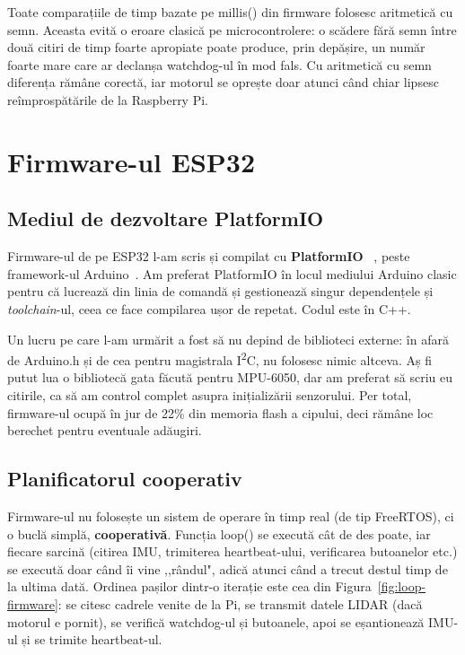 \documentclass[a4paper,12pt,twoside,openany]{report}
\renewcommand{\texttt}[1]{\textnormal{#1}}
\begin{document}
Toate comparațiile de timp bazate pe \texttt{millis()} din firmware folosesc
aritmetică cu semn. Aceasta evită o eroare clasică pe microcontrolere: o
scădere fără semn între două citiri de timp foarte apropiate poate produce,
prin depășire, un număr foarte mare care ar declanșa watchdog-ul în mod fals.
Cu aritmetică cu semn diferența rămâne corectă, iar motorul se oprește doar
atunci când chiar lipsesc reîmprospătările de la Raspberry Pi.

\clearpage

\chapter{Firmware-ul ESP32}
\label{cap:firmware}

\section{Mediul de dezvoltare PlatformIO}
\label{sec:pio}

Firmware-ul de pe ESP32 l-am scris și compilat cu \textbf{PlatformIO}%
~\cite{platformio}, peste framework-ul Arduino~\cite{arduinoesp32}. Am
preferat PlatformIO în locul mediului Arduino clasic pentru că lucrează din
linia de comandă și gestionează singur dependențele și \textit{toolchain}-ul,
ceea ce face compilarea ușor de repetat. Codul este în C++.

Un lucru pe care l-am urmărit a fost să nu depind de biblioteci externe: în
afară de \texttt{Arduino.h} și de cea pentru magistrala I\textsuperscript{2}C,
nu folosesc nimic altceva. Aș fi putut lua o bibliotecă gata făcută pentru
MPU-6050, dar am preferat să scriu eu citirile, ca să am control complet
asupra inițializării senzorului. Per total, firmware-ul ocupă în jur de
22\% din memoria flash a cipului, deci rămâne loc berechet pentru eventuale
adăugiri.

\section{Planificatorul cooperativ}
\label{sec:scheduler}

Firmware-ul nu folosește un sistem de operare în timp real (de tip FreeRTOS),
ci o buclă simplă, \textbf{cooperativă}. Funcția \texttt{loop()} se execută cât
de des poate, iar fiecare sarcină (citirea IMU, trimiterea heartbeat-ului,
verificarea butoanelor etc.) se execută doar când îi vine ,,rândul", adică
atunci când a trecut destul timp de la ultima dată. Ordinea pașilor dintr-o
iterație este cea din Figura~\ref{fig:loop-firmware}: se citesc cadrele venite
de la Pi, se transmit datele LIDAR (dacă motorul e pornit), se verifică
watchdog-ul și butoanele, apoi se eșantionează IMU-ul și se trimite
heartbeat-ul.
\end{document}
